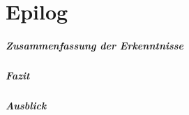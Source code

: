 \chapter{Epilog} \label{kritischeBetrachtung}
\paragraph{Zusammenfassung der Erkenntnisse}
\paragraph{Fazit}
\paragraph{Ausblick}